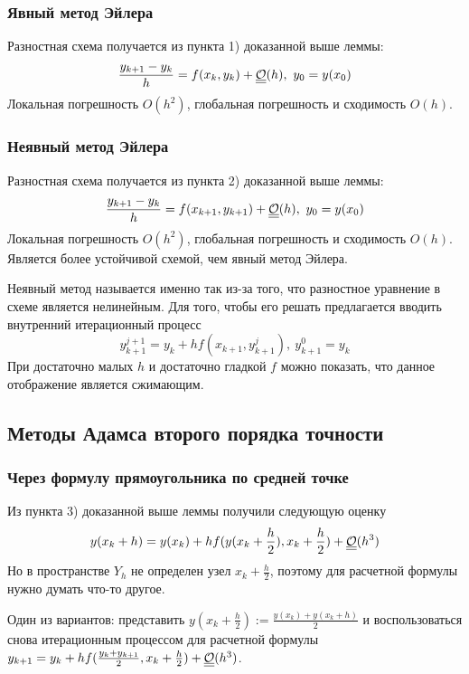 \subsubsection*{Явный метод Эйлера}
Разностная схема получается из пункта 1) доказанной выше леммы:
\[\frac{y_{k+1}-y_k}{h}= f(x_k,y_k) + \bigO(h),\ y_0=y(x_0)\]
Локальная погрешность $O(h^2)$, глобальная погрешность и сходимость $O(h)$.

\subsubsection*{Неявный метод Эйлера}
Разностная схема получается из пункта 2) доказанной выше леммы:
\[\frac{y_{k+1}-y_k}{h}= f(x_{k+1},y_{k+1}) + \underline{\underline{\mathcal{O}}}(h),\ y_0=y(x_0)\]
Локальная погрешность $O(h^2)$, глобальная погрешность и сходимость $O(h)$.
Является более устойчивой схемой, чем явный метод Эйлера.

Неявный метод называется именно так из-за того, что разностное уравнение
в схеме является нелинейным. Для того, чтобы его решать предлагается
вводить внутренний итерационный процесс
\[y_{k+1}^{j+1}= y_k+hf(x_{k+1},y_{k+1}^{j}),\ y_{k+1}^{0}=y_{k}\]
При достаточно малых $h$ и достаточно гладкой $f$ можно показать,
что данное отображение является сжимающим.

\subsection*{Методы Адамса второго порядка точности}

\subsubsection*{Через формулу прямоугольника по средней точке}
Из пункта 3) доказанной выше леммы получили следующую оценку
\[y(x_k+h)=y(x_k)+hf(y(x_k+\frac{h}{2}), x_k+\frac{h}{2})+\underline{\underline{\mathcal{O}}}(h^3)\]
Но в пространстве $Y_h$ не определен узел $x_k+\frac{h}{2}$, поэтому
для расчетной формулы нужно думать что-то другое.

Один из вариантов: представить $y(x_k+\frac{h}{2}):=\frac{y(x_k)+y(x_k+h)}{2}$ и
воспользоваться снова итерационным процессом для расчетной
формулы $y_{k+1}=y_{k}+hf(\frac{y_k+y_{k+1}}{2}, x_k+\frac{h}{2})+\underline{\underline{\mathcal{O}}}(h^3)$.

